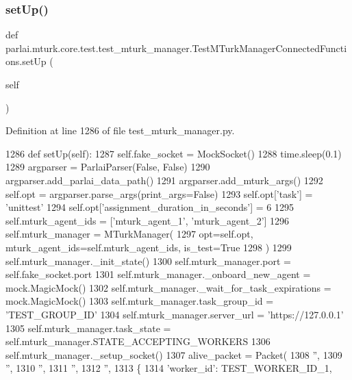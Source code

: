 \subsubsection{\texorpdfstring{set\+Up()}{setUp()}}
{\footnotesize\ttfamily def parlai.\+mturk.\+core.\+test.\+test\+\_\+mturk\+\_\+manager.\+Test\+M\+Turk\+Manager\+Connected\+Functions.\+set\+Up (\begin{DoxyParamCaption}\item[{}]{self }\end{DoxyParamCaption})}



Definition at line 1286 of file test\+\_\+mturk\+\_\+manager.\+py.


\begin{DoxyCode}
1286     \textcolor{keyword}{def }setUp(self):
1287         self.fake\_socket = MockSocket()
1288         time.sleep(0.1)
1289         argparser = ParlaiParser(\textcolor{keyword}{False}, \textcolor{keyword}{False})
1290         argparser.add\_parlai\_data\_path()
1291         argparser.add\_mturk\_args()
1292         self.opt = argparser.parse\_args(print\_args=\textcolor{keyword}{False})
1293         self.opt[\textcolor{stringliteral}{'task'}] = \textcolor{stringliteral}{'unittest'}
1294         self.opt[\textcolor{stringliteral}{'assignment\_duration\_in\_seconds'}] = 6
1295         self.mturk\_agent\_ids = [\textcolor{stringliteral}{'mturk\_agent\_1'}, \textcolor{stringliteral}{'mturk\_agent\_2'}]
1296         self.mturk\_manager = MTurkManager(
1297             opt=self.opt, mturk\_agent\_ids=self.mturk\_agent\_ids, is\_test=\textcolor{keyword}{True}
1298         )
1299         self.mturk\_manager.\_init\_state()
1300         self.mturk\_manager.port = self.fake\_socket.port
1301         self.mturk\_manager.\_onboard\_new\_agent = mock.MagicMock()
1302         self.mturk\_manager.\_wait\_for\_task\_expirations = mock.MagicMock()
1303         self.mturk\_manager.task\_group\_id = \textcolor{stringliteral}{'TEST\_GROUP\_ID'}
1304         self.mturk\_manager.server\_url = \textcolor{stringliteral}{'https://127.0.0.1'}
1305         self.mturk\_manager.task\_state = self.mturk\_manager.STATE\_ACCEPTING\_WORKERS
1306         self.mturk\_manager.\_setup\_socket()
1307         alive\_packet = Packet(
1308             \textcolor{stringliteral}{''},
1309             \textcolor{stringliteral}{''},
1310             \textcolor{stringliteral}{''},
1311             \textcolor{stringliteral}{''},
1312             \textcolor{stringliteral}{''},
1313             \{
1314                 \textcolor{stringliteral}{'worker\_id'}: TEST\_WORKER\_ID\_1,

\end{DoxyCode}
